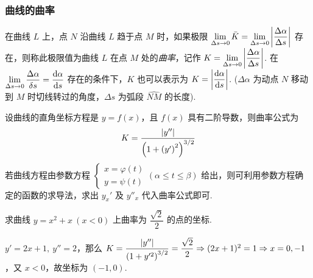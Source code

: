 \subsubsection{曲线的曲率}

\begin{definition}[曲率]
    在曲线 $L$ 上，点 $N$ 沿曲线 $L$ 趋于点 $M$ 时，如果极限 $\displaystyle\lim_{\Delta s\to0}\bar{K}=\lim_{\Delta s\to0}\qty|\dfrac{\Delta\alpha}{\Delta s}|$ 存在，则称此极限值为曲线 $L$ 在点 $M$ 处的\textit{曲率}，记作 $K=\displaystyle\lim_{\Delta s\to0}\qty|\dfrac{\Delta\alpha}{\Delta s}|$.
    在 $\displaystyle\lim_{\Delta s\to0}\dfrac{\Delta\alpha}{\delta s}=\dv{\alpha}{s}$ 存在的条件下，$K$ 也可以表示为 $K=\qty|\dfrac{\dd \alpha}{\dd s}|$. ($\Delta \alpha$ 为动点 $N$ 移动到 $M$ 时切线转过的角度，$\Delta s$ 为弧段 $\widehat{NM} $ 的长度).
\end{definition}

\begin{theorem}[曲率的计算公式]
    设曲线的直角坐标方程是 $y=f(x)$，且 $f(x)$ 具有二阶导数，则曲率公式为 $$K=\dfrac{|y''|}{\qty(1+\qty(y')^2)^{3/2}}$$
    若曲线方程由参数方程 $\begin{cases}
            x=\varphi(t) \\y=\psi(t)
        \end{cases}(\alpha \leqslant t\leqslant \beta)$ 给出，则可利用参数方程确定的函数的求导法，求出 $y_x'$ 及 $y''_x$ 代入曲率公式即可.
\end{theorem}

\begin{example}[2012 数二]
    求曲线 $y=x^2+x~(x<0)$ 上曲率为 $\dfrac{\sqrt{2}}{2}$ 的点的坐标.
\end{example}
\begin{solution}
    $y'=2x+1,~y''=2$，那么 $K=\dfrac{|y''|}{\qty(1+y'^2)^{3/2}}=\dfrac{\sqrt{2}}{2}\Rightarrow (2x+1)^2=1\Rightarrow x=0,-1$，又 $x<0$，故坐标为 $(-1,0).$
\end{solution}

